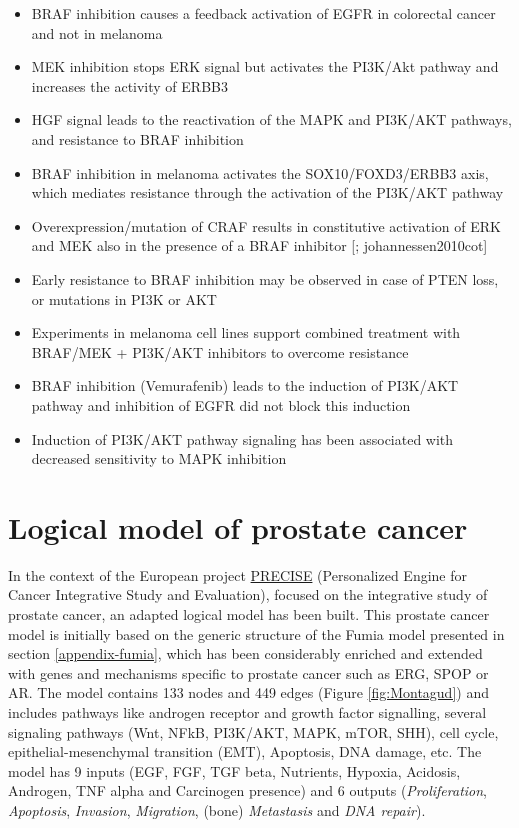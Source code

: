 \documentclass[a4paper,12pt,twoside,onecolumn,openright,final,oldfontcommands]{memoir}
\providecommand{\tightlist}{%
  \setlength{\itemsep}{0pt}\setlength{\parskip}{0pt}}
\begin{document}
\begin{itemize}
\tightlist
\item
  BRAF inhibition causes a feedback activation of EGFR in colorectal
  cancer and not in melanoma \citep{prahallad2012unresponsiveness}
\item
  MEK inhibition stops ERK signal but activates the PI3K/Akt pathway and
  increases the activity of ERBB3
  \citep{gopal2010basal, lake2016negative}
\item
  HGF signal leads to the reactivation of the MAPK and PI3K/AKT
  pathways, and resistance to BRAF inhibition \citep{wroblewski2013bh3}
\item
  BRAF inhibition in melanoma activates the SOX10/FOXD3/ERBB3 axis,
  which mediates resistance through the activation of the PI3K/AKT
  pathway \citep{han2018erk}
\item
  Overexpression/mutation of CRAF results in constitutive activation of
  ERK and MEK also in the presence of a BRAF inhibitor
  {[}\citet{manzano2016resistant}; johannessen2010cot{]}
\item
  Early resistance to BRAF inhibition may be observed in case of PTEN
  loss, or mutations in PI3K or AKT \citep{manzano2016resistant}
\item
  Experiments in melanoma cell lines support combined treatment with
  BRAF/MEK + PI3K/AKT inhibitors to overcome resistance
  \citep{manzano2016resistant}
\item
  BRAF inhibition (Vemurafenib) leads to the induction of PI3K/AKT
  pathway and inhibition of EGFR did not block this induction
  \citep{corcoran2012egfr}
\item
  Induction of PI3K/AKT pathway signaling has been associated with
  decreased sensitivity to MAPK inhibition \citep{corcoran2012egfr}
\end{itemize}

\section{Logical model of prostate cancer}\label{appendix-montagud}

In the context of the European project
\href{https://precise-project.eu/}{PRECISE} (Personalized Engine for
Cancer Integrative Study and Evaluation), focused on the integrative
study of prostate cancer, an adapted logical model has been built. This
prostate cancer model is initially based on the generic structure of the
Fumia model presented in section \ref{appendix-fumia}, which has been
considerably enriched and extended with genes and mechanisms specific to
prostate cancer such as ERG, SPOP or AR. The model contains 133 nodes
and 449 edges (Figure \ref{fig:Montagud}) and includes pathways like
androgen receptor and growth factor signalling, several signaling
pathways (Wnt, NFkB, PI3K/AKT, MAPK, mTOR, SHH), cell cycle,
epithelial-mesenchymal transition (EMT), Apoptosis, DNA damage, etc. The
model has 9 inputs (EGF, FGF, TGF beta, Nutrients, Hypoxia, Acidosis,
Androgen, TNF alpha and Carcinogen presence) and 6 outputs
(\emph{Proliferation}, \emph{Apoptosis}, \emph{Invasion},
\emph{Migration}, (bone) \emph{Metastasis} and \emph{DNA repair}).
\end{document}
